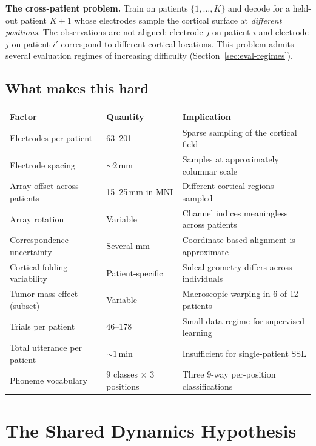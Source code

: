 \documentclass[11pt,letterpaper]{article}
\begin{document}
\textbf{The cross-patient problem.} Train on patients $\{1, \ldots, K\}$ and decode for a held-out patient $K{+}1$ whose electrodes sample the cortical surface at \emph{different positions}. The observations are not aligned: electrode $j$ on patient $i$ and electrode $j$ on patient $i'$ correspond to different cortical locations. This problem admits several evaluation regimes of increasing difficulty (Section~\ref{sec:eval-regimes}).

\subsection{What makes this hard}

\begin{table}[ht!]
\centering\small
\begin{tabular}{@{}lll@{}}
\toprule
\textbf{Factor} & \textbf{Quantity} & \textbf{Implication} \\
\midrule
Electrodes per patient & 63--201 & Sparse sampling of the cortical field \\
Electrode spacing & ${\sim}2$\,mm & Samples at approximately columnar scale \\
Array offset across patients & 15--25\,mm in MNI & Different cortical regions sampled \\
Array rotation & Variable & Channel indices meaningless across patients \\
Correspondence uncertainty & Several mm & Coordinate-based alignment is approximate \\
Cortical folding variability & Patient-specific & Sulcal geometry differs across individuals \\
Tumor mass effect (subset) & Variable & Macroscopic warping in 6 of 12 patients \\
Trials per patient & 46--178 & Small-data regime for supervised learning \\
Total utterance per patient & ${\sim}1$\,min & Insufficient for single-patient SSL \\
Phoneme vocabulary & 9 classes $\times$ 3 positions & Three 9-way per-position classifications \\
\bottomrule
\end{tabular}
\end{table}


\section{The Shared Dynamics Hypothesis}\label{sec:shared}
\end{document}

